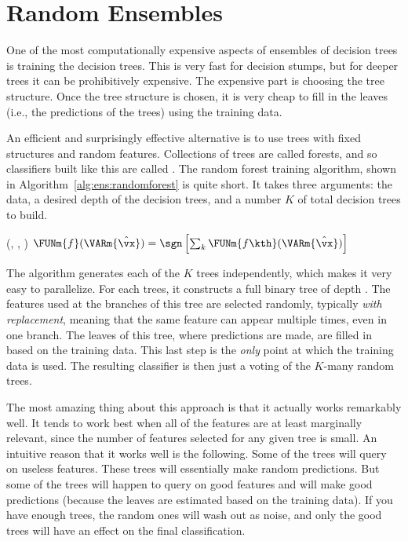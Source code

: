 \section{Random Ensembles}

One of the most computationally expensive aspects of ensembles of
decision trees is training the decision trees.  This is very fast for
decision stumps, but for deeper trees it can be prohibitively
expensive.  The expensive part is choosing the tree structure.  Once
the tree structure is chosen, it is very cheap to fill in the leaves
(i.e., the predictions of the trees) using the training data.

An efficient and surprisingly effective alternative is to use trees
with fixed structures and random features.  Collections of trees are
called forests, and so classifiers built like this are called
.  The random forest training algorithm, shown
in Algorithm~\ref{alg:ens:randomforest} is quite short.  It takes
three arguments: the data, a desired depth of the decision trees, and
a number $K$ of total decision trees to build.

%
  {(\VAR{$\cD$}, , )}%
  {
\ENDFOR
\RETURN $\FUNm{f}(\VARm{\hat \vx}) = \sgn\left[ \sum_k \FUNm{f\kth}(\VARm{\hat\vx}) \right]$
}

The algorithm generates each of the $K$ trees independently, which
makes it very easy to parallelize.  For each trees, it constructs a
full binary tree of depth .  The features used at the
branches of this tree are selected randomly, typically \emph{with
  replacement}, meaning that the same feature can appear multiple
times, even in one branch.  The leaves of this tree, where predictions
are made, are filled in based on the training data.  This last step is
the \emph{only} point at which the training data is used.  The
resulting classifier is then just a voting of the $K$-many random
trees.

The most amazing thing about this approach is that it actually works
remarkably well.  It tends to work best when all of the features are
at least marginally relevant, since the number of features selected
for any given tree is small.  An intuitive reason that it works well
is the following.  Some of the trees will query on useless features.
These trees will essentially make random predictions.  But some of the
trees will happen to query on good features and will make good
predictions (because the leaves are estimated based on the training
data).  If you have enough trees, the random ones will wash out as
noise, and only the good trees will have an effect on the final
classification.


